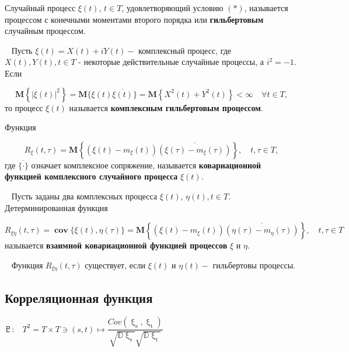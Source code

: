  \begin{definition}{\cite{MillerRPET2001}} Случайный процесс $\xi(t)$, $t \in T$, удовлетворяющий условию $(*)$, называется процессом с конечными моментами второго порядка или \textbf{гильбертовым} случайным процессом.
\end{definition}

 \begin{definition}~\cite{MillerRPET2001} Пусть $\xi(t)=X(t)+i Y(t)-$ комплексный процесс, где $X(t), Y(t), t \in T$ - некоторые действительные случайные процессы, а $i^{2}=-1$. Если 

$$
\mathbf{M}\left\{|\xi(t)|^{2}\right\}=\mathbf{M}\{\xi(t) \overline{\xi(t)}\}=\mathbf{M}\left\{X^{2}(t)+Y^{2}(t)\right\}<\infty \quad \forall t \in T,
$$
то процесс $\xi(t)$ называется \textbf{комплексным гильбертовым процессом}.

Функция

$$
R_{\xi}(t, \tau)=\mathbf{M}\left\{\left(\xi(t)-m_{\xi}(t)\right) \overline{\left(\xi(\tau)-m_{\xi}(\tau)\right)}\right\}, \quad t, \tau \in T,
$$
где $\overline{\{\cdot\}}$ означает комплексное сопряжение, называется \textbf{ковариационной функцией комплексного случайного процесса} $\xi(t)$.
\end{definition}

 \begin{definition}~\cite{MillerRPET2001} Пусть заданы два комплексных процесса $\xi(t)$, $\eta(t), t \in T$. Детерминированная функция

$$
R_{\xi \eta}(t, \tau)=\operatorname{\textbf{cov}}\{\xi(t), \eta(\tau)\}=\mathbf{M}\left\{\left(\xi(t)-m_{\xi}(t)\right) \overline{\left(\eta(\tau)-m_{\eta}(\tau)\right)}\right\}, \quad t, \tau \in T
$$
называется \textbf{взаимной ковариационной функцией процессов} $\xi$ и $\eta$.
\end{definition}

 \begin{remark}~\cite{MillerRPET2001} Функция $R_{\xi \eta}(t, \tau)$ существует, если $\xi(t)$ и $\eta(t)-$ гильбертовы процессы.
\end{remark}

\subsection{Корреляционная функция}

\cite{ShamarovDRP11} $\pluto\text{:} \quad T^2 = T \times T \ni (s,t) \longmapsto \dfrac{Cov(\upxi_\text{s}, \upxi_\text{t})}{\sqrt{\mathds{D}\upxi_\text{s}} \sqrt{\mathds{D}\upxi_\text{t}}}$



